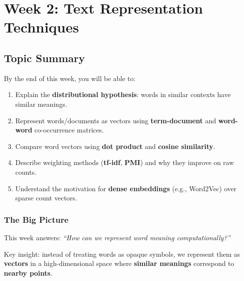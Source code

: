 \section{Week 2: Text Representation Techniques}

\subsection{Topic Summary}

\begin{keybox}
By the end of this week, you will be able to:
\begin{enumerate}
  \item Explain the \textbf{distributional hypothesis}: words in similar contexts have similar meanings.
  \item Represent words/documents as vectors using \textbf{term-document} and \textbf{word-word} co-occurrence matrices.
  \item Compare word vectors using \textbf{dot product} and \textbf{cosine similarity}.
  \item Describe weighting methods (\textbf{tf-idf}, \textbf{PMI}) and why they improve on raw counts.
  \item Understand the motivation for \textbf{dense embeddings} (e.g., Word2Vec) over sparse count vectors.
\end{enumerate}
\end{keybox}

\separator

\subsubsection*{The Big Picture}

This week answers: \textit{``How can we represent word meaning computationally?''}

Key insight: instead of treating words as opaque symbols, we represent them as \textbf{vectors} in a high-dimensional space where \textbf{similar meanings} correspond to \textbf{nearby points}.

